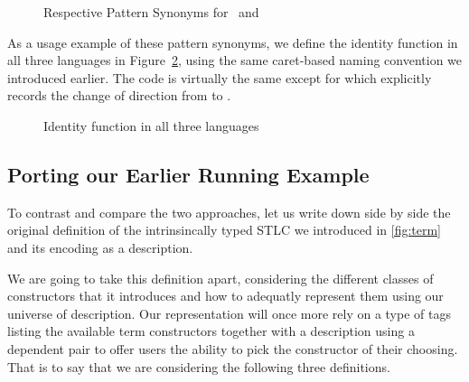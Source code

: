 \begin{figure}[h]
  \begin{AgdaSuppressSpace}
  \end{AgdaSuppressSpace}
  \caption{Respective Pattern Synonyms for ~and %
    \label{fig:patsLC}}
\end{figure}

As a usage example of these pattern synonyms, we define the identity
function in all three languages in Figure~\ref{fig:identity}, using the
same caret-based naming convention we introduced earlier. The code
is virtually the same except for  which explicitly records
the change of direction from  to .

\begin{figure}[h]
\begin{minipage}{0.25\textwidth}
\end{minipage}\hfill
\begin{minipage}{0.35\textwidth}
\end{minipage}\hfill
\begin{minipage}{0.30\textwidth}
\end{minipage}
\caption{Identity function in all three languages}\label{fig:identity}
\end{figure}

\subsection{Porting our Earlier Running Example}

To contrast and compare the two approaches, let us write down side by side
the original definition of the intrinsincally typed STLC we introduced in
\cref{fig:term} and its encoding as a description.

We are going to take this definition apart, considering the different
classes of constructors that it introduces and how to adequatly represent
them using our universe of description. Our representation will once more
rely on a type  of tags listing the available term constructors
together with a description  using a dependent pair to offer users
the ability to pick the constructor of their choosing. That is to say that
we are considering the following three definitions.

